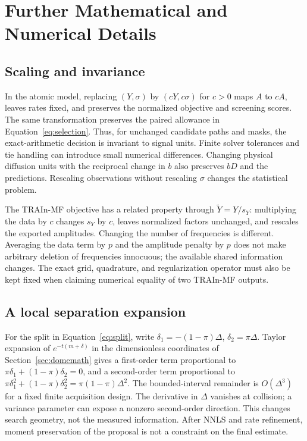 \section{Further Mathematical and Numerical Details}
\subsection{Scaling and invariance}
In the atomic model, replacing $(Y,\sigma)$ by $(cY,c\sigma)$ for $c>0$ maps $A$ to $cA$, leaves rates fixed, and preserves the normalized objective and screening scores. The same transformation preserves the paired allowance in Equation~\eqref{eq:selection}. Thus, for unchanged candidate paths and masks, the exact-arithmetic decision is invariant to signal units. Finite solver tolerances and tie handling can introduce small numerical differences. Changing physical diffusion units with the reciprocal change in $b$ also preserves $bD$ and the predictions. Rescaling observations without rescaling $\sigma$ changes the statistical problem.

The TRAIn-MF objective has a related property through $\widetilde Y=Y/s_Y$: multiplying the data by $c$ changes $s_Y$ by $c$, leaves normalized factors unchanged, and rescales the exported amplitudes. Changing the number of frequencies is different. Averaging the data term by $p$ and the amplitude penalty by $p$ does not make arbitrary deletion of frequencies innocuous; the available shared information changes. The exact grid, quadrature, and regularization operator must also be kept fixed when claiming numerical equality of two TRAIn-MF outputs.

\subsection{A local separation expansion}
For the split in Equation~\eqref{eq:split}, write $\delta_1=-(1-\pi)\Delta$, $\delta_2=\pi\Delta$. Taylor expansion of $e^{-t(m+\delta)}$ in the dimensionless coordinates of Section~\ref{sec:domemath} gives a first-order term proportional to $\pi\delta_1+(1-\pi)\delta_2=0$, and a second-order term proportional to $\pi\delta_1^2+(1-\pi)\delta_2^2=\pi(1-\pi)\Delta^2$. The bounded-interval remainder is $O(\Delta^3)$ for a fixed finite acquisition design. The derivative in $\Delta$ vanishes at collision; a variance parameter can expose a nonzero second-order direction. This changes search geometry, not the measured information. After NNLS and rate refinement, moment preservation of the proposal is not a constraint on the final estimate.

